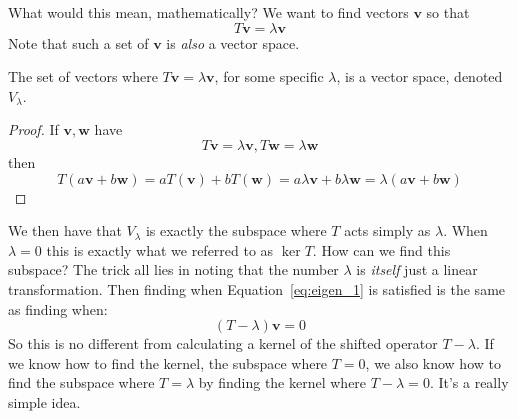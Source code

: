 \begin{appendices}
	
	What would this mean, mathematically? We want to find vectors $\mathbf v$ so that
	\begin{equation}\label{eq:eigen_1}
		T \mathbf v = \lambda \mathbf v
	\end{equation}
	Note that such a set of $\mathbf v$ is \emph{also} a vector space.
	\begin{prop}
	The set of vectors where $T \mathbf v = \lambda \mathbf v$, for some specific $\lambda$, is a vector space, denoted $V_\lambda$. 
	\end{prop}
	\begin{proof}
		If $\mathbf v, \mathbf w$ have
		\begin{equation*}
			T \mathbf v = \lambda \mathbf v, T \mathbf w = \lambda \mathbf w
		\end{equation*}
		then
		\begin{equation*}
			T(a \mathbf v + b \mathbf w) = a T(\mathbf v) + b T(\mathbf w) = a \lambda \mathbf v + b \lambda \mathbf w = \lambda(a \mathbf v + b \mathbf w)
		\end{equation*}
	\end{proof}
	We then have that $V_\lambda$ is exactly the subspace where $T$ acts simply as $\lambda$.
	When $\lambda = 0$ this is exactly what we referred to as $\ker T$. How can we find this subspace? The trick all lies in noting that the number $\lambda$ is \emph{itself} just a linear transformation. Then finding when Equation~\eqref{eq:eigen_1} is satisfied is the same as finding when:
	\begin{equation}
		(T - \lambda) \mathbf v = 0
	\end{equation}
	So this is no different from calculating a kernel of the shifted operator $T - \lambda$. If we know how to find the kernel, the subspace where $T = 0$, we also know how to find the subspace where $T = \lambda$ by finding the kernel where $T - \lambda = 0$. It's a really simple idea.
	

\end{appendices}
